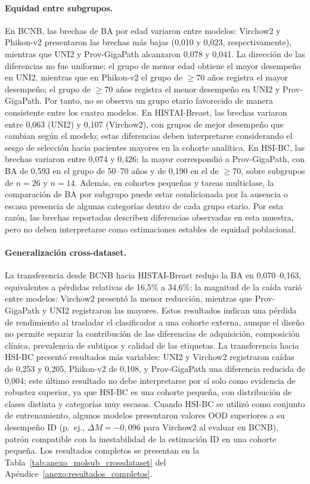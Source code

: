 \paragraph{Equidad entre subgrupos.} En BCNB, las brechas de BA por edad variaron entre modelos: Virchow2 y Phikon-v2 presentaron las brechas más bajas (0,010 y 0,023, respectivamente), mientras que UNI2 y Prov-GigaPath alcanzaron 0,078 y 0,041. La dirección de las diferencias no fue uniforme: el grupo de menor edad obtiene el mayor desempeño en UNI2, mientras que en Phikon-v2 el grupo de $\geq 70$ años registra el mayor desempeño; el grupo de $\geq 70$ años registra el menor desempeño en UNI2 y Prov-GigaPath. Por tanto, no se observa un grupo etario favorecido de manera consistente entre los cuatro modelos. En HISTAI-Breast, las brechas variaron entre 0,063 (UNI2) y 0,107 (Virchow2), con grupos de mejor desempeño que cambian según el modelo; estas diferencias deben interpretarse considerando el sesgo de selección hacia pacientes mayores en la cohorte analítica. En HSI-BC, las brechas variaron entre 0,074 y 0,426; la mayor correspondió a Prov-GigaPath, con BA de 0,593 en el grupo de 50--70 años y de 0,190 en el de $\geq 70$, sobre subgrupos de $n=26$ y $n=14$. Además, en cohortes pequeñas y tareas multiclase, la comparación de BA por subgrupo puede estar condicionada por la ausencia o escasa presencia de algunas categorías dentro de cada grupo etario. Por esta razón, las brechas reportadas describen diferencias observadas en esta muestra, pero no deben interpretarse como estimaciones estables de equidad poblacional.

\paragraph{Generalización cross-dataset.} La transferencia desde BCNB hacia HISTAI-Breast redujo la BA en 0,070--0,163, equivalentes a pérdidas relativas de 16,5\% a 34,6\%; la magnitud de la caída varió entre modelos: Virchow2 presentó la menor reducción, mientras que Prov-GigaPath y UNI2 registraron las mayores. Estos resultados indican una pérdida de rendimiento al trasladar el clasificador a una cohorte externa, aunque el diseño no permite separar la contribución de las diferencias de adquisición, composición clínica, prevalencia de subtipos y calidad de las etiquetas. La transferencia hacia HSI-BC presentó resultados más variables: UNI2 y Virchow2 registraron caídas de 0,253 y 0,205, Phikon-v2 de 0,108, y Prov-GigaPath una diferencia reducida de 0,004; este último resultado no debe interpretarse por sí solo como evidencia de robustez superior, ya que HSI-BC es una cohorte pequeña, con distribución de clases distinta y categorías muy escasas. Cuando HSI-BC se utilizó como conjunto de entrenamiento, algunos modelos presentaron valores OOD superiores a su desempeño ID (p.\ ej., $\Delta M = -0{,}096$ para Virchow2 al evaluar en BCNB), patrón compatible con la inestabilidad de la estimación ID en una cohorte pequeña. Los resultados completos se presentan en la Tabla~\ref{tab:anexo_molsub_crossdataset} del Apéndice~\ref{anexo:resultados_completos}.

